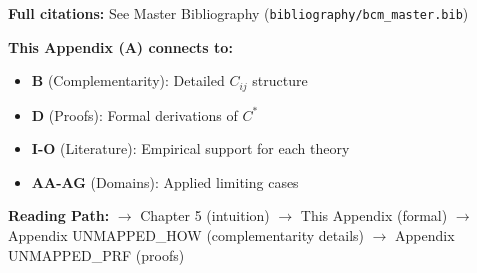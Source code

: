 \textbf{Full citations:} See Master Bibliography (\texttt{bibliography/bcm\_master.bib})


\begin{tcolorbox}[colback=gray!10!white, colframe=gray!75!black,
    title=\textbf{Cross-Reference Footer}]
\label{sec:A-footer}

\textbf{This Appendix (A) connects to:}
\begin{itemize}[nosep]
    \item \textbf{B} (Complementarity): Detailed $C_{ij}$ structure
    \item \textbf{D} (Proofs): Formal derivations of $C^*$
    \item \textbf{I-O} (Literature): Empirical support for each theory
    \item \textbf{AA-AG} (Domains): Applied limiting cases
\end{itemize}

\textbf{Reading Path:}
$\rightarrow$ Chapter 5 (intuition) $\rightarrow$ This Appendix (formal)
$\rightarrow$ Appendix UNMAPPED_HOW (complementarity details) $\rightarrow$ Appendix UNMAPPED_PRF (proofs)

\end{tcolorbox}
